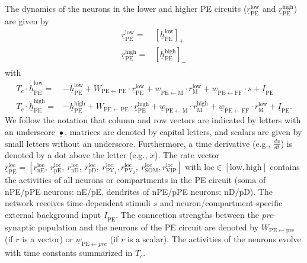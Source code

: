 \documentclass[10pt,a4paper]{article}
\begin{document}
The dynamics of the neurons in the lower and higher PE circuits ($\underline{r}_\mathrm{PE}^\mathrm{low}$ and $\underline{r}_\mathrm{PE}^\mathrm{high}$) are given by
%
\begin{align}
\underline{r}_\mathrm{PE}^\mathrm{low} = & \left[ \underline{h}_\mathrm{PE}^\mathrm{low} \right]_+ \nonumber\\
%
\underline{r}_\mathrm{PE}^\mathrm{high} = & \left[ \underline{h}_\mathrm{PE}^\mathrm{high} \right]_+ 
\end{align}
%
with
%
\begin{align}
T_{c} \cdot \underline{\dot{h}}_\mathrm{PE}^\mathrm{low} =& -\underline{h}_\mathrm{PE}^\mathrm{low} + W_\mathrm{PE\leftarrow PE} \cdot \underline{r}_\mathrm{PE}^\mathrm{low} + \underline{w}_\mathrm{PE\leftarrow M} \cdot r_\mathrm{M}^\mathrm{low} + \underline{w}_\mathrm{PE\leftarrow FF} \cdot s + \underline{I}_\mathrm{PE} \nonumber\\
%
T_{c} \cdot \underline{\dot{h}}_\mathrm{PE}^\mathrm{high} =& -\underline{h}_\mathrm{PE}^\mathrm{high} + W_\mathrm{PE\leftarrow PE} \cdot \underline{r}_\mathrm{PE}^\mathrm{high} + \underline{w}_\mathrm{PE\leftarrow M} \cdot r_\mathrm{M}^\mathrm{high} + \underline{w}_\mathrm{PE\leftarrow FF} \cdot r_\mathrm{M}^\mathrm{low} + \underline{I}_\mathrm{PE}.
%
\end{align}
%
We follow the notation that column and row vectors are indicated by letters with an underscore $\underline{\bullet}$, matrices are denoted by capital letters, and scalars are given by small letters without an underscore. Furthermore, a time derivative (e.g., $\frac{dx}{dt}$) is denoted by a dot above the letter (e.g., $\dot{x}$). The rate vector $\underline{r}_\mathrm{PE}^\mathrm{loc} = \left[r_\mathrm{nE}^\mathrm{loc},\ r_\mathrm{pE}^\mathrm{loc},\ r_\mathrm{nD}^\mathrm{loc},\ r_\mathrm{pD}^\mathrm{loc},\ r_\mathrm{PV_1}^\mathrm{loc}, r_\mathrm{PV_2}^\mathrm{loc},\ r_\mathrm{SOM}^\mathrm{loc}, r_\mathrm{VIP}^\mathrm{loc} \right]$  with $\mathrm{loc} \in [\mathrm{low}, \mathrm{high}]$ contains the activities of all neurons or compartments in the PE circuit (soma of nPE/pPE neurons: nE/pE, dendrites of nPE/pPE neurons: nD/pD). The network receives time-dependent stimuli $s$ and neuron/compartment-specific external background input $\underline{I}_\mathrm{PE}$. The connection strengths between the \textit{pre}-synaptic population and the neurons of the PE circuit are denoted by $W_\mathrm{PE\leftarrow pre}$ (if $r$ is a vector) or $\underline{w}_{\mathrm{PE} \leftarrow pre}$ (if $r$ is a scalar). The activities of the neurons evolve with time constants summarized in $T_{c}$.
\end{document}
